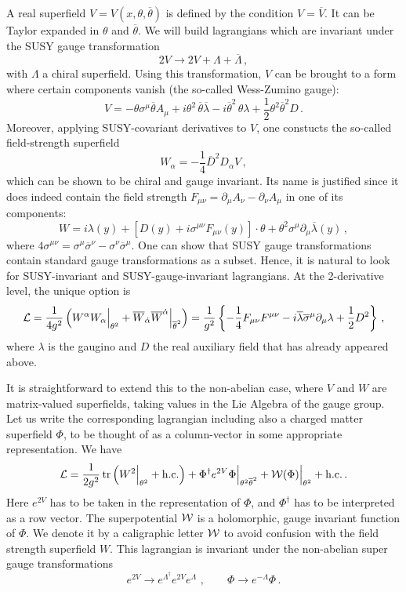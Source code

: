 \documentclass[12pt]{article}
\newcommand{\be}{\begin{equation}}
\newcommand{\ee}{\end{equation}}
\newcommand{\ol}{\overline}
\numberwithin{equation}{section}
\begin{document}
A real superfield $V=V(x,\theta,\ol{\theta})$ is defined by the condition $V=\ol{V}$. It can be Taylor expanded in $\theta$ and $\ol{\theta}$. We will build lagrangians which are invariant under the SUSY gauge transformation
\be
2V\to 2V+\Lambda+\ol{\Lambda}\,,
\ee
with $\Lambda$ a chiral superfield. Using this transformation, $V$ can be brought to a form where certain components vanish (the so-called Wess-Zumino gauge):
\be
V=-\theta\sigma^\mu\ol{\theta}A_\mu+i\theta^2\,\ol{\theta}\ol{\lambda}-i \ol{\theta}^2\,\theta\lambda+\frac{1}{2}\theta^2\ol{\theta}^2 D\,.
\ee
Moreover, applying SUSY-covariant derivatives to $V$, one constucts the so-called field-strength superfield
\be
W_\alpha=-\frac{1}{4}\ol{D}^2D_\alpha V\,,
\ee
which can be shown to be chiral and gauge invariant. Its name is justified since it does indeed contain the field strength $F_{\mu\nu}=\partial_\mu A_\nu- \partial_\nu A_\mu$ in one of its components:
\be
W=i\lambda(y)+\left[D(y)+i\sigma^{\mu\nu}F_{\mu\nu}(y)\right]\cdot\theta+ \theta^2\sigma^\mu\partial_\mu\ol{\lambda}(y)\,,
\ee
where $4\sigma^{\mu\nu}=\sigma^\mu\ol{\sigma}^\nu-\sigma^\nu\ol{\sigma}^\mu$. One can show that SUSY gauge transformations contain standard gauge transformations as a subset. Hence, it is natural to look for SUSY-invariant and SUSY-gauge-invariant lagrangians. At the 2-derivative level, the unique option is
\be
{\cal L}=\frac{1}{4g^2}\left(W^\alpha W_\alpha\Big|_{\theta^2} +\ol{W}_{\dot{\alpha}} \ol{W}^{\dot{\alpha}}\Big|_{\ol{\theta}^2}\right)
=\frac{1}{g^2}\left\{ -\frac{1}{4}F_{\mu\nu}F^{\mu\nu}-i\ol{\lambda} \ol{\sigma}^\mu\partial_\mu\lambda +\frac{1}{2}D^2\right\}\,,
\ee
where $\lambda$ is the gaugino and $D$ the real auxiliary field that has already appeared above.

It is straightforward to extend this to the non-abelian case, where $V$ and $W$ are matrix-valued superfields, taking values in the Lie Algebra of the gauge group. Let us write the corresponding lagrangian including also a charged matter superfield $\Phi$, to be thought of as a column-vector in some appropriate representation. We have
\be
{\cal L}=\frac{1}{2g^2}\,\mbox{tr}\left( W^2\Big|_{\theta^2}+\mbox{h.c.}\right)
+\Phi^\dagger e^{2V}\Phi\Big|_{\theta^2\ol{\theta}^2}+{\cal W}(\Phi)\Big|_{\theta^2}+\mbox{h.c.}\,.
\ee
Here $e^{2V}$ has to be taken in the representation of $\Phi$, and $\Phi^\dagger$ has to be interpreted as a row vector. The superpotential ${\cal W}$ is a holomorphic, gauge invariant function of $\Phi$. We denote it by a caligraphic letter ${\cal W}$ to avoid confusion with the field strength superfield $W$. This lagrangian is invariant under the non-abelian super gauge transformations
\be
e^{2V}\to e^{\Lambda^\dagger} e^{2V}e^{\Lambda}\,\,,\qquad \Phi\to e^{-\Lambda}\Phi\,.
\ee
\end{document}
